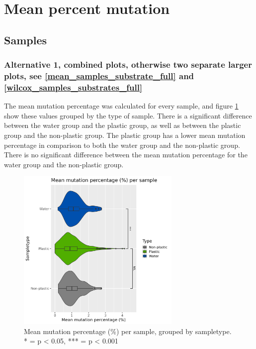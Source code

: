 \section{Mean percent mutation}

\subsection{Samples} 
\subsubsection{Alternative 1, combined plots, otherwise two separate larger plots, see \ref{mean_samples_substrate_full} and \ref{wilcox_samples_substrates_full}}
The mean mutation percentage was calculated for every sample, and figure \ref{mean_samples_sampletype} show these values grouped by the type of sample.
There is a significant difference between the water group and the plastic group, as well as between the plastic group and the non-plastic group. 
The plastic group has a lower mean mutation percentage in comparison to both the water group and the non-plastic group. There is no significant difference between the mean mutation percentage for the water group and the non-plastic group.


\begin{figure}[h]
    \centering
    \includegraphics[width = 0.7\textwidth]{figure/mean_samples_sampletype.png}
    \caption{Mean mutation percentage (\%) per sample, grouped by sampletype. * = p < 0.05, *** = p < 0.001}
    \label{mean_samples_sampletype}
\end{figure}

